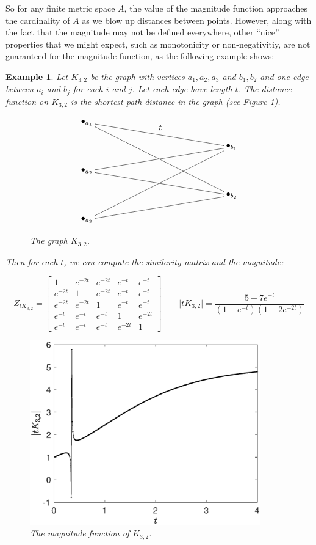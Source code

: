 \documentclass[11pt]{article}
\theoremstyle{mythm}
\newtheorem{ex}[defn]{Example}
\begin{document}
So for any finite metric space $A$, the value of the magnitude function approaches the cardinality of $A$ as we blow up distances between points. However, along with the fact that the magnitude may not be defined everywhere, other ``nice'' properties that we might expect, such as monotonicity or non-negativitiy, are not guaranteed for the magnitude function, as the following example shows:

\begin{ex}
Let $K_{3,2}$ be the graph with vertices $a_1,a_2,a_3$ and $b_1,b_2$ and one edge between $a_i$ and $b_j$ for each $i$ and $j$. Let each edge have length $t$. The distance function on $K_{3,2}$ is the shortest path distance in the graph (see Figure \ref{fig:K32}).

\begin{figure}[h!]
\begin{equation*}
\begin{xy}
(0,0)*+{\bullet_{a_1}}="a1";
(0,-20)*+{\bullet_{a_2}}="a2";
(0,-40)*+{\bullet_{a_3}}="a3";
(60,-10)*+{\bullet_{b_1}}="b1";
(60,-30)*+{\bullet_{b_2}}="b2";
{\ar@{-} "a1";"b1"}?*!/_3mm/{t};
{\ar@{-} "a2";"b1"};
{\ar@{-} "a3";"b1"};
{\ar@{-} "a1";"b2"};
{\ar@{-} "a2";"b2"};
{\ar@{-} "a3";"b2"};
\end{xy}
\end{equation*}
\caption{\label{fig:K32}The graph $K_{3,2}$.}
\end{figure}

Then for each $t$, we can compute the similarity matrix and the magnitude:

\begin{equation*}
Z_{tK_{3,2}} = \begin{bmatrix} 1 & e^{-2t} & e^{-2t} & e^{-t} & e^{-t} \\
e^{-2t} & 1 & e^{-2t} & e^{-t} & e^{-t} \\
e^{-2t} & e^{-2t} & 1 & e^{-t} & e^{-t} \\
e^{-t} & e^{-t} & e^{-t} & 1 & e^{-2t} \\
e^{-t} & e^{-t} & e^{-t} & e^{-2t} & 1
\end{bmatrix} \qquad
\vert tK_{3,2} \vert = \frac{5-7e^{-t}}{(1+e^{-t})(1-2e^{-2t})}
\end{equation*}

\begin{figure}[h!]
\centerline{
\includegraphics[width=10cm]{K32.eps}}\caption{\label{fig:K32magfun}The magnitude function of $K_{3,2}$.}
\end{figure}


\end{ex}
\end{document}
